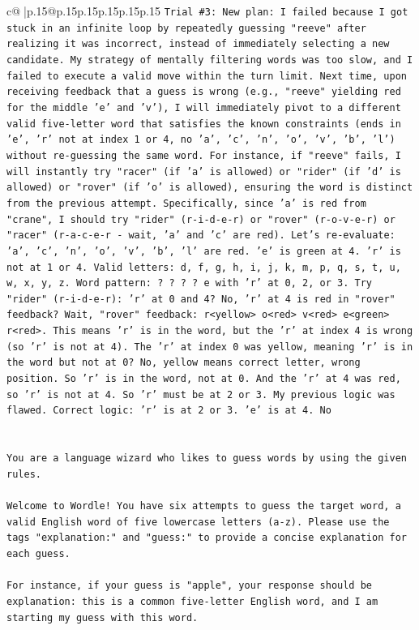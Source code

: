 \documentclass{article}
\begin{document}
{\begin{supertabular}{c@{$\;$}|p{.15\linewidth}@{}p{.15\linewidth}p{.15\linewidth}p{.15\linewidth}p{.15\linewidth}p{.15\linewidth}}
{{{\texttt{Trial \#3: New plan: I failed because I got stuck in an infinite loop by repeatedly guessing "reeve" after realizing it was incorrect, instead of immediately selecting a new candidate. My strategy of mentally filtering words was too slow, and I failed to execute a valid move within the turn limit. Next time, upon receiving feedback that a guess is wrong (e.g., "reeve" yielding red for the middle 'e' and 'v'), I will immediately pivot to a different valid five{-}letter word that satisfies the known constraints (ends in 'e', 'r' not at index 1 or 4, no 'a', 'c', 'n', 'o', 'v', 'b', 'l') without re{-}guessing the same word. For instance, if "reeve" fails, I will instantly try "racer" (if 'a' is allowed) or "rider" (if 'd' is allowed) or "rover" (if 'o' is allowed), ensuring the word is distinct from the previous attempt. Specifically, since 'a' is red from "crane", I should try "rider" (r{-}i{-}d{-}e{-}r) or "rover" (r{-}o{-}v{-}e{-}r) or "racer" (r{-}a{-}c{-}e{-}r {-} wait, 'a' and 'c' are red). Let's re{-}evaluate: 'a', 'c', 'n', 'o', 'v', 'b', 'l' are red. 'e' is green at 4. 'r' is not at 1 or 4. Valid letters: d, f, g, h, i, j, k, m, p, q, s, t, u, w, x, y, z. Word pattern: ? ? ? ? e with 'r' at 0, 2, or 3. Try "rider" (r{-}i{-}d{-}e{-}r): 'r' at 0 and 4? No, 'r' at 4 is red in "rover" feedback? Wait, "rover" feedback: r<yellow> o<red> v<red> e<green> r<red>. This means 'r' is in the word, but the 'r' at index 4 is wrong (so 'r' is not at 4). The 'r' at index 0 was yellow, meaning 'r' is in the word but not at 0? No, yellow means correct letter, wrong position. So 'r' is in the word, not at 0. And the 'r' at 4 was red, so 'r' is not at 4. So 'r' must be at 2 or 3. My previous logic was flawed. Correct logic: 'r' is at 2 or 3. 'e' is at 4. No} \\
\\ 
\\ 
\texttt{You are a language wizard who likes to guess words by using the given rules.} \\
\\ 
\texttt{Welcome to Wordle! You have six attempts to guess the target word, a valid English word of five lowercase letters (a{-}z). Please use the tags "explanation:" and "guess:" to provide a concise explanation for each guess.} \\
\\ 
\texttt{For instance, if your guess is "apple", your response should be} \\
\texttt{explanation: this is a common five{-}letter English word, and I am starting my guess with this word.} \\
}}}
\end{supertabular}}
\end{document}

